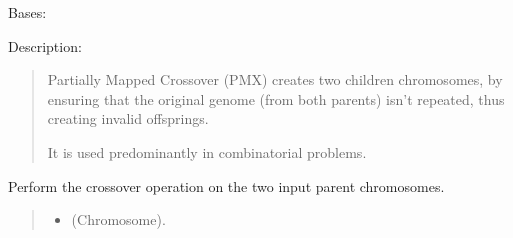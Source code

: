 \documentclass[letterpaper,10pt,english]{sphinxmanual}
\begin{document}
\begin{fulllineitems}
\label{\detokenize{pygenalgo.operators.crossover:pygenalgo.operators.crossover.partially_mapped_crossover.PartiallyMappedCrossover}}
\pysigstartsignatures
\pysiglinewithargsret
{}
{}
{}
\pysigstopsignatures
\sphinxAtStartPar
Bases: {\hyperref[\detokenize{pygenalgo.operators.crossover:pygenalgo.operators.crossover.crossover_operator.CrossoverOperator}]{}}

\sphinxAtStartPar
Description:
\begin{quote}

\sphinxAtStartPar
Partially Mapped Crossover (PMX) creates two children chromosomes, by ensuring that the
original genome (from both parents) isn’t repeated, thus creating invalid offsprings.

\sphinxAtStartPar
It is used predominantly in combinatorial problems.
\end{quote}

\begin{fulllineitems}
\label{\detokenize{pygenalgo.operators.crossover:pygenalgo.operators.crossover.partially_mapped_crossover.PartiallyMappedCrossover.crossover}}
\pysigstartsignatures
\pysiglinewithargsret
{}
{\sphinxparamcomma {}}
{}
\pysigstopsignatures
\sphinxAtStartPar
Perform the crossover operation on the two input parent chromosomes.
\begin{quote}\begin{description}
\begin{itemize}
\item {} 
\sphinxAtStartPar
{} \textendash{} (Chromosome).


\end{itemize}
\end{description}
\end{quote}
\end{fulllineitems}
\end{fulllineitems}
\end{document}
